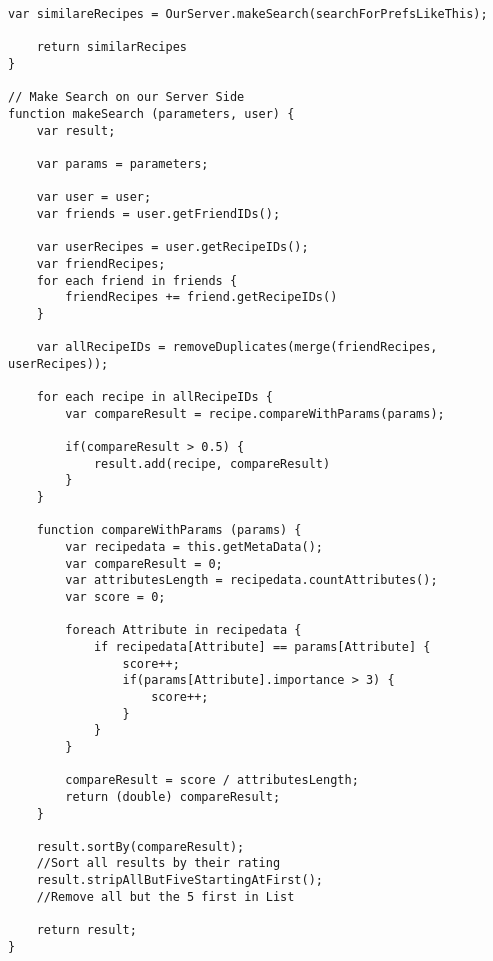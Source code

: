 \begin{lstlisting}[caption=Pseudocode - Ähnliche Rezepte,label={lst:SimilarRecipes}]
    var similareRecipes = OurServer.makeSearch(searchForPrefsLikeThis);

    return similarRecipes
}

// Make Search on our Server Side
function makeSearch (parameters, user) {
    var result;

    var params = parameters;

    var user = user;
    var friends = user.getFriendIDs();
    
    var userRecipes = user.getRecipeIDs();
    var friendRecipes;
    for each friend in friends {
        friendRecipes += friend.getRecipeIDs()
    }

    var allRecipeIDs = removeDuplicates(merge(friendRecipes, userRecipes));

    for each recipe in allRecipeIDs {
        var compareResult = recipe.compareWithParams(params);

        if(compareResult > 0.5) {
            result.add(recipe, compareResult)
        }
    }

    function compareWithParams (params) {
        var recipedata = this.getMetaData();
        var compareResult = 0;
        var attributesLength = recipedata.countAttributes();
        var score = 0;

        foreach Attribute in recipedata {
            if recipedata[Attribute] == params[Attribute] {
                score++;
                if(params[Attribute].importance > 3) {
                    score++;
                }
            }
        }

        compareResult = score / attributesLength;
        return (double) compareResult;
    }

    result.sortBy(compareResult);               
    //Sort all results by their rating
    result.stripAllButFiveStartingAtFirst();    
    //Remove all but the 5 first in List

    return result;
}
\end{lstlisting}
\newpage
